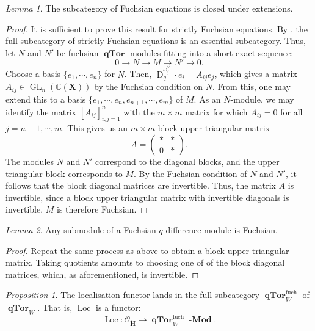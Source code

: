 \documentclass[a4paper]{report}
\theoremstyle{theorem}
\theoremstyle{definition}
\theoremstyle{remark}
\theoremstyle{proposition}
\newtheorem{proposition}{Proposition}
\theoremstyle{conjecture}
\theoremstyle{lemma}
\newtheorem{lemma}{Lemma}
\theoremstyle{corollary}
\theoremstyle{exercise}
\theoremstyle{example}
\newcommand{\C}{\mathbb{C}}
\newcommand{\mcal}{\mathcal}
\newcommand{\on}{\operatorname}
\newcommand{\lmod}{\on{\mathbf{-Mod}}}
\newcommand{\qTor}{\on{\mathbf{qTor}}}
\begin{document}
  \begin{lemma}\label{lem_Fuchsian_ext}
      The subcategory of Fuchsian equations is closed under extensions. 
  \end{lemma}
  
  \begin{proof}
      It is sufficient to prove this result for strictly Fuchsian equations.
      By \cite[Lemma 2.1.2.1]{sauloy03}, the full subcategory of strictly
      Fuchsian equations is an essential subcategory. 
      Thus, let $N$ and $N'$ be fuchsian $\qTor$-modules fitting into a short exact sequence:
      $$0 \longrightarrow N \longrightarrow M \longrightarrow N' \longrightarrow 0.$$
      Choose a basis $\lbrace e_1,\cdots,e_n \rbrace$ for $N$. 
      Then, $\on{D}^{\omega_j^\vee}_q \cdot e_i = A_{ij} e_j$, which gives a matrix 
      $A_{ij} \in \on{GL}_n(\C(\mathbf{X}))$ by the Fuchsian condition on $N$. From this, one may extend this 
      to a basis $\lbrace e_1,\cdots,e_n,e_{n+1},\cdots,e_m\rbrace$ of $M$.
      As an $N$-module, we may identify the matrix $[A_{ij}]_{i,j=1}^n$ 
      with the $m\times m$ matrix for which $A_{ij} = 0$ for all $j = n+1,\cdots,m$.
      This gives us an $m\times m$ block upper triangular matrix 
      $$A = \begin{pmatrix}
          \ast & \ast\\
          0 & \ast 
      \end{pmatrix}.$$
      The modules $N$ and $N'$ correspond to the diagonal blocks, and the upper triangular block corresponds to $M$. By the Fuchsian condition of $N$ 
      and $N'$, it follows that the block diagonal matrices 
      are invertible. Thus, the matrix $A$ is invertible, since a block upper triangular matrix with invertible diagonals is invertible.
      $M$ is therefore Fuchsian.
  \end{proof}
  
  \begin{lemma}\label{lem_Fuchsian_quotient}
      Any submodule of a Fuchsian $q$-difference module is Fuchsian.
  \end{lemma}
  
  \begin{proof}
      Repeat the same process as above to obtain a block upper triangular matrix.
      Taking quotients amounts to choosing one of of the block diagonal matrices,
      which, as aforementioned, is invertible.
  \end{proof}
  
  \begin{proposition}\label{prop_cat_o_Fuchsian}
      The localisation functor lands in the full subcategory $\qTor^{\on{fuch}}_W$ of $\qTor_W$. That is, 
      $\on{Loc}$ is a functor:
      $$\on{Loc} : \mcal{O}_{\mathbf{\ddot{\mathbf{H}}}} \longrightarrow \qTor_W^{\on{fuch}}\lmod.$$
  \end{proposition}
  
\end{document}
